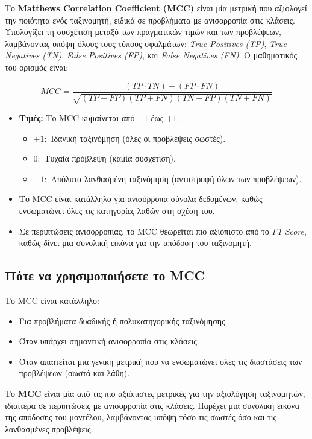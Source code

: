 \documentclass[diploma]{softlab-thesis}
\begin{document}
Το \textbf{Matthews Correlation Coefficient (MCC)} είναι μία μετρική που αξιολογεί την ποιότητα ενός ταξινομητή, ειδικά σε προβλήματα με ανισορροπία στις κλάσεις. Υπολογίζει τη συσχέτιση μεταξύ των πραγματικών τιμών και των προβλέψεων, λαμβάνοντας υπόψη όλους τους τύπους σφαλμάτων: \textit{True Positives (TP)}, \textit{True Negatives (TN)}, \textit{False Positives (FP)}, και \textit{False Negatives (FN)}. Ο μαθηματικός του ορισμός είναι:

\[
MCC = \frac{(TP \cdot TN) - (FP \cdot FN)}{\sqrt{(TP + FP)(TP + FN)(TN + FP)(TN + FN)}}
\]

\begin{itemize}
    \item \textbf{Τιμές:}
    Το MCC κυμαίνεται από \(-1\) έως \(+1\):
    \begin{itemize}
        \item \(+1:\) Ιδανική ταξινόμηση (όλες οι προβλέψεις σωστές).
        \item \(0:\) Τυχαία πρόβλεψη (καμία συσχέτιση).
        \item \(-1:\) Απόλυτα λανθασμένη ταξινόμηση (αντιστροφή όλων των προβλέψεων).
    \end{itemize}
    
\item Το MCC είναι κατάλληλο για ανισόρροπα σύνολα δεδομένων, καθώς ενσωματώνει όλες τις κατηγορίες λαθών στη σχέση του.

\item  Σε περιπτώσεις ανισορροπίας, το MCC θεωρείται πιο αξιόπιστο από το \textit{F1 Score}, καθώς δίνει μια συνολική εικόνα για την απόδοση του ταξινομητή.
\end{itemize}

\subsection*{Πότε να χρησιμοποιήσετε το MCC}
Το MCC είναι κατάλληλο:
\begin{itemize}
    \item Για προβλήματα δυαδικής ή πολυκατηγορικής ταξινόμησης.
    \item Όταν υπάρχει σημαντική ανισορροπία στις κλάσεις.
    \item Όταν απαιτείται μια γενική μετρική που να ενσωματώνει όλες τις διαστάσεις των προβλέψεων (σωστά και λάθη).
\end{itemize}

Το \textbf{MCC} είναι μία από τις πιο αξιόπιστες μετρικές για την αξιολόγηση ταξινομητών, ιδιαίτερα σε περιπτώσεις με ανισορροπία στις κλάσεις. Παρέχει μια συνολική εικόνα της απόδοσης του μοντέλου, λαμβάνοντας υπόψη τόσο τις σωστές όσο και τις λανθασμένες προβλέψεις.
\end{document}
